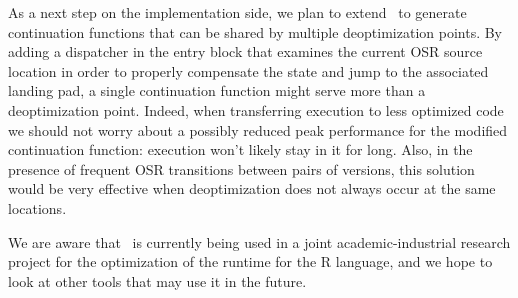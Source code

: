 As a next step on the implementation side, we plan to extend \osrkit\ to generate continuation functions that can be shared by multiple deoptimization points. By adding a dispatcher in the entry block that examines the current OSR source location in order to properly compensate the state and jump to the associated landing pad, a single continuation function might serve more than a deoptimization point. Indeed, when transferring execution to less optimized code we should not worry about a possibly reduced peak performance for the modified continuation function: execution won't likely stay in it for long. Also, in the presence of frequent OSR transitions between pairs of versions, this solution would be very effective when deoptimization does not always occur at the same locations.

We are aware that \osrkit\ is currently being used in a joint academic-industrial research project for the optimization of the runtime for the R language, and we hope to look at other tools that may use it in the future.